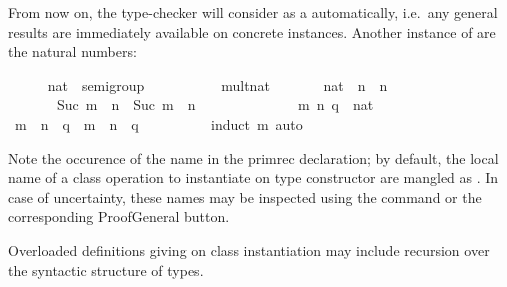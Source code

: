 \begin{isabellebody}
\begin{isamarkuptext}
  From now on, the type-checker will consider 
  as a  automatically, i.e.\ any general results
  are immediately available on concrete instances.
  \medskip Another instance of  are the natural numbers:%
\end{isamarkuptext}%
\isamarkuptrue%
\ \ \ \ \isamarkupfalse%
\ nat\ {\isacharcolon}{\isacharcolon}\ semigroup\isanewline
\ \ \ \ \isanewline
\isanewline
\ \ \ \ \isamarkupfalse%
\ mult{\isacharunderscore}nat\ \isanewline
\ \ \ \ \ \ {\isachardoublequoteopen}{\isacharparenleft}{}{\isasymColon}nat{\isacharparenright}\ {\isasymotimes}\ n\ {\isacharequal}\ n{\isachardoublequoteclose}\isanewline
\ \ \ \ \ \ {\isacharbar}\ {\isachardoublequoteopen}Suc\ m\ {\isasymotimes}\ n\ {\isacharequal}\ Suc\ {\isacharparenleft}m\ {\isasymotimes}\ n{\isacharparenright}{\isachardoublequoteclose}\isanewline
\isanewline
\ \ \ \ \isamarkupfalse%
%
\isadelimproof
\ %
\endisadelimproof
%
\isatagproof
{}\isamarkupfalse%
\isanewline
\ \ \ \ \ \ \isamarkupfalse%
\ m\ n\ q\ {\isacharcolon}{\isacharcolon}\ nat\ \isanewline
\ \ \ \ \ \ \isamarkupfalse%
\ {\isachardoublequoteopen}m\ {\isasymotimes}\ n\ {\isasymotimes}\ q\ {\isacharequal}\ m\ {\isasymotimes}\ {\isacharparenleft}n\ {\isasymotimes}\ q{\isacharparenright}{\isachardoublequoteclose}\isanewline
\ \ \ \ \ \ \ \ \isamarkupfalse%
\ {\isacharparenleft}induct\ m{\isacharparenright}\ auto\isanewline
\ \ \ \ \isamarkupfalse%
%
\endisatagproof
{\isafoldproof}%
%
\isadelimproof
%
\endisadelimproof
\isanewline
\isanewline
\ \ \ \ \isamarkupfalse%
%
\begin{isamarkuptext}%
\noindent Note the occurence of the name 
  in the primrec declaration;  by default, the local name of
  a class operation  to instantiate on type constructor
  \isa{{\isasymkappa}} are mangled as .  In case of uncertainty,
  these names may be inspected using the \isa{{\isasymPRINTCONTEXT}} command
  or the corresponding ProofGeneral button.%
\end{isamarkuptext}%
\isamarkuptrue%
%
\isamarkuptrue%
%
\begin{isamarkuptext}%
Overloaded definitions giving on class instantiation
  may include recursion over the syntactic structure of types.

\end{isamarkuptext}
\end{isabellebody}
